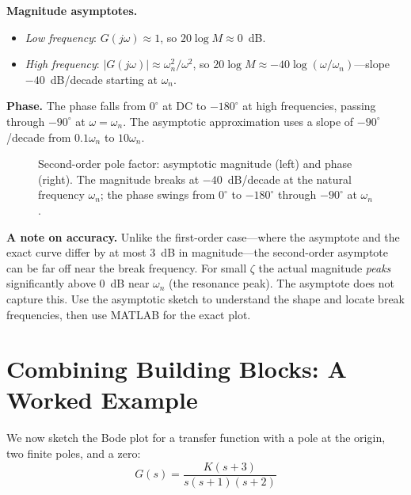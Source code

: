 \documentclass[../../book.tex]{subfiles}
\begin{document}
\textbf{Magnitude asymptotes.}
\begin{itemize}
  \item \emph{Low frequency}: $G(j\omega) \approx 1$, so $20\log M \approx 0$~dB.
  \item \emph{High frequency}: $|G(j\omega)| \approx \omega_n^2/\omega^2$,
    so $20\log M \approx -40\log(\omega/\omega_n)$---slope $-40$~dB/decade
    starting at $\omega_n$.
\end{itemize}

\textbf{Phase.}  The phase falls from $0^\circ$ at DC to $-180^\circ$ at
high frequencies, passing through $-90^\circ$ at $\omega = \omega_n$.
The asymptotic approximation uses a slope of $-90^\circ$/decade from
$0.1\omega_n$ to $10\omega_n$.

\begin{figure}[htbp]
  \caption{Second-order pole factor: asymptotic magnitude (left) and phase
    (right).  The magnitude breaks at $-40$~dB/decade at the natural frequency
    $\omega_n$; the phase swings from $0^\circ$ to $-180^\circ$ through
    $-90^\circ$ at $\omega_n$.}
  \label{fig:second_order_bode}
\end{figure}

\textbf{A note on accuracy.}  Unlike the first-order case---where the asymptote
and the exact curve differ by at most 3~dB in magnitude---the second-order
asymptote can be far off near the break frequency.  For small $\zeta$ the
actual magnitude \emph{peaks} significantly above 0~dB near $\omega_n$ (the
resonance peak).  The asymptote does not capture this.  Use the asymptotic
sketch to understand the shape and locate break frequencies, then use MATLAB
for the exact plot.

\section{Combining Building Blocks: A Worked Example}
\label{sec:example}

We now sketch the Bode plot for a transfer function with a pole at the origin,
two finite poles, and a zero:
\begin{equation}
  G(s) = \frac{K(s+3)}{s(s+1)(s+2)}
  \label{eq:example_tf}
\end{equation}
\end{document}
